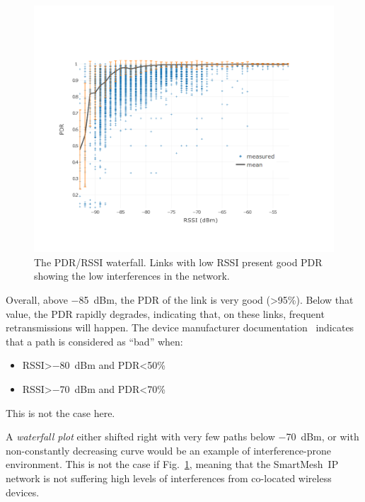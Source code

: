 \documentclass{sig-alternate}
\newcommand{\smip}                {SmartMesh~IP\xspace}
\begin{document}
\begin{figure}
    \centering
    \includegraphics[width=\columnwidth]{waterfall}
    \caption{
        The PDR/RSSI waterfall.
        Links with low RSSI present good PDR showing the low interferences in the network.
    }
    \label{fig:waterfall}
\end{figure}

Overall, above $-$85~dBm, the PDR of the link is very good (>95\%).
Below that value, the PDR rapidly degrades, indicating that, on these links, frequent retransmissions will happen.
The device manufacturer documentation~\cite{smip_app_note} indicates that a path is considered as ``bad'' when:

\begin{itemize}
  \item RSSI>$-$80~dBm and PDR<50\%
  \item RSSI>$-$70~dBm and PDR<70\%
\end{itemize}

This is not the case here.


A \textit{waterfall plot} either shifted right with very few paths below $-$70~dBm, or with non-constantly decreasing curve would be an example of interference-prone environment.
This is not the case if Fig.~\ref{fig:waterfall}, meaning that the \smip network is not suffering high levels of interferences from co-located wireless devices.

\end{document}
